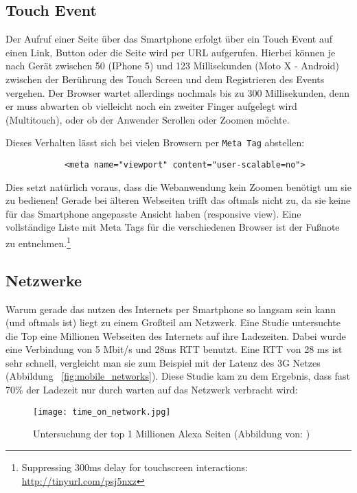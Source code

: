 	\subsection{Touch Event} %
	\label{sub:touch_event}
		Der Aufruf einer Seite über das Smartphone erfolgt über ein Touch Event auf einen Link, Button oder die Seite wird per URL aufgerufen. Hierbei können je nach Gerät zwischen 50 (IPhone 5) und 123 Millisekunden (Moto X - Android) zwischen der Berührung des Touch Screen und dem Registrieren des Events vergehen.\autocite{venturebeat} Der Browser wartet allerdings nochmals bis zu 300 Millisekunden, denn er muss abwarten ob vielleicht noch ein zweiter Finger aufgelegt wird (Multitouch), oder ob der Anwender Scrollen oder Zoomen möchte.\autocite{google11}

		Dieses Verhalten lässt sich bei vielen Browsern per \texttt{Meta Tag} abstellen:

		\begin{lstlisting}
			<meta name="viewport" content="user-scalable=no">
		\end{lstlisting}

		Dies setzt natürlich voraus, dass die Webanwendung kein Zoomen benötigt um sie zu bedienen! Gerade bei älteren Webseiten trifft das oftmals nicht zu, da sie keine für das Smartphone angepasste Ansicht haben (responsive view). Eine vollständige Liste mit Meta Tags für die verschiedenen Browser ist der Fußnote zu entnehmen.\footnote{Suppressing 300ms delay for touchscreen interactions: \url{http://tinyurl.com/psj5nxz}}


	\subsection{Netzwerke} %
	\label{sub:netzwerke}
		Warum gerade das nutzen des Internets per Smartphone so langsam sein kann (und oftmals ist) liegt zu einem Großteil am Netzwerk. Eine Studie untersuchte die Top eine Millionen Webseiten des Internets auf ihre Ladezeiten. Dabei wurde eine Verbindung von 5 Mbit/s und 28ms RTT benutzt. Eine RTT von 28 ms ist sehr schnell, vergleicht man sie zum Beispiel mit der Latenz des 3G Netzes (Abbildung ~\ref{fig:mobile_networks}). Diese Studie kam zu dem Ergebnis, dass fast 70\% der Ladezeit nur durch warten auf das Netzwerk verbracht wird:

		\begin{figure}[htbp]
			\begin{center}
				\texttt{[image: time\_on\_network.jpg]}
				\caption{Untersuchung der top 1 Millionen Alexa Seiten (Abbildung von: \autocite{alexa})}
				\label{fig:time_on_network}
			\end{center}
		\end{figure}

